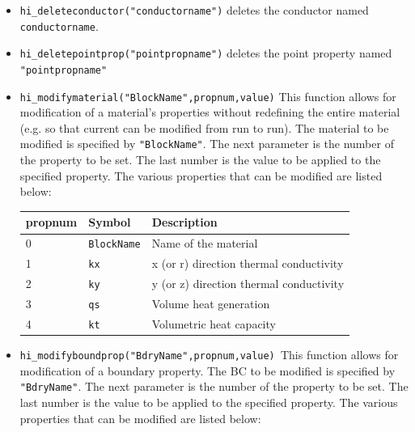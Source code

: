 \begin{itemize}
\item \texttt{hi\_deleteconductor("conductorname")} deletes the conductor named
\texttt{conductorname}.

\item \texttt{hi\_deletepointprop("pointpropname")} deletes the point property named
\texttt{"pointpropname"}

\item \texttt{hi\_modifymaterial("BlockName",propnum,value)} This function allows for
modification of a material's properties without redefining the
entire material (e.g. so that current can be modified from run to
run). The material to be modified is specified by
\texttt{"BlockName"}. The next parameter is the number of the
property to be set. The last number is the value to be applied to
the specified property. The various properties that can be modified
are listed below:

\begin{tabular}{lll}
propnum & Symbol &  Description \\ \hline
 0 & \texttt{BlockName} & Name of the material \\
 1 & \texttt{kx} & x (or r) direction thermal conductivity \\
 2 & \texttt{ky} & y (or z) direction thermal conductivity \\
 3 & \texttt{qs} & Volume heat generation \\
 4 & \texttt{kt} & Volumetric heat capacity 
\end{tabular}


\item \texttt{hi\_modifyboundprop("BdryName",propnum,value) }This function allows for
modification of a boundary property. The BC to be modified is specified by
\texttt{"BdryName"}. The next parameter is the number of the property to be
set. The last number is the value to be applied to the specified property.
The various properties that can be modified are listed below:


\end{itemize}
